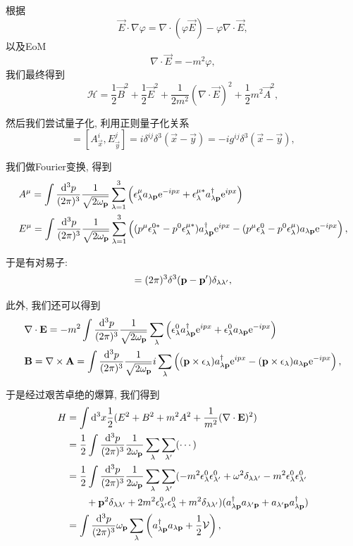 根据
\begin{equation}
    \vec E\cdot\nabla\varphi=\nabla\cdot(\varphi\vec E)-\varphi\nabla\cdot\vec E,
\end{equation}
以及EoM
\begin{equation}
    \nabla\cdot\vec E=-m^2\varphi,
\end{equation}
我们最终得到
\begin{equation}
    \mathcal H=\frac12\vec B^2+\frac12\vec E^2+\frac1{2m^2}(\nabla\cdot\vec E)^2+\frac12m^2\vec A^2,
\end{equation}

然后我们尝试量子化, 利用正则量子化关系
\begin{equation}
    [A^i_{\vec x}, \Pi^{0j}_{\vec y}]=[A^i_{\vec x}, E^j_{\vec y}]=i\delta^{ij}\delta^3(\vec x-\vec y)=-ig^{ij}\delta^3(\vec x-\vec y),
\end{equation}

我们做Fourier变换, 得到
\begin{align}
    &A^\mu=\int\ldsq{p}\sum_{\lambda=1}^3\left(\epsilon_\lambda^\mu a_{\lambda\vec p}\exp{-ipx}+\epsilon_\lambda^{\mu*}a^\dagger_{\lambda\vec p}\exp{ipx}\right)\\
    &E^\mu=\int\ldsq{p}\sum_{\lambda=1}^3\left((p^\mu\epsilon_\lambda^{0*}-p^0\epsilon_\lambda^{\mu*})a^\dagger_{\lambda\vec p}\exp{ipx}-(p^\mu\epsilon^0_\lambda-p^0\epsilon_\lambda^\mu)a_{\lambda\vec p}\exp{-ipx}\right),
\end{align}

于是有对易子:
\begin{equation}
    [a_{\lambda\vec p}, a^\dagger_{\lambda'\vec p'}]=\dpi3\delta^3(\vec p-\vec p')\delta_{\lambda\lambda'},
\end{equation}

此外, 我们还可以得到
\begin{align}
    &\nabla\cdot\vec E=-m^2\int\ldsq p \sum_\lambda\left(\epsilon_\lambda^0a^\dagger_{\lambda\vec p}\exp{ipx}+\epsilon_\lambda^0a_{\lambda\vec p}\exp{-ipx}\right)\\
    &\vec B=\nabla\times\vec A=\int\ldsq p i\sum_\lambda\left((\vec p\times\vec\epsilon_\lambda)a_{\lambda\vec p}^\dagger\exp{ipx}-(\vec p\times\vec\epsilon_\lambda)a_{\lambda\vec p}\exp{-ipx}\right),
\end{align}

于是经过艰苦卓绝的爆算, 我们得到
\begin{align}
    H&=\int\d^3x\frac12(E^2+B^2+m^2A^2+\frac1{m^2}(\nabla\cdot\vec E)^2)\\
    &=\frac12\int\ld p\sum_\lambda\sum_{\lambda'}(\cdots)\\
    &=\frac12\int\ld p\sum_\lambda\sum_{\lambda'}(-m^2\epsilon_\lambda^0\epsilon_{\lambda'}^0+\omega^2\delta_{\lambda\lambda'}-m^2\epsilon^0_{\lambda}\epsilon^0_{\lambda'}\notag\\
    &\quad\quad+\vec p^2\delta_{\lambda\lambda'}+2m^2\epsilon_{\lambda'}^0\epsilon_\lambda^0+m^2\delta_{\lambda\lambda'})(a^\dagger_{\lambda\vec p}a_{\lambda'\vec p}+a_{\lambda'\vec p}a^\dagger_{\lambda\vec p})\\
    &=\int\ddd p\om p\sum_\lambda\left(a^\dagger_{\lambda\vec p}a_{\lambda\vec p}+\frac12\mathcal V\right),
\end{align}

